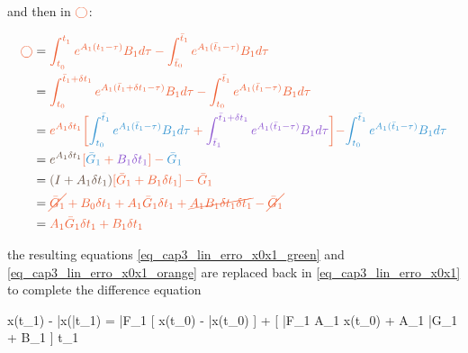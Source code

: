 \noindent
and then in $\orange{\bigcirc}$:

\noindent
\begin{align}
	\label{eq_cap3_lin_erro_x0x1_orange}
	\orange{\bigcirc} 	&= \orange{ \intlinAA{0}{1}{}{} - \intlinAbtt{0}{1} } \nonumber \\ 
				   	&= \orange{ \intlinCb{t_0}{\bar{t}_1+\delta t_1}{0}{1} - \intlinAbft{0}{1} } \nonumber \\
				   	&= \orange{ e^{A_1 \delta t_1} \bigg[ \blue{\intlinAbft{0}{1}} + \purple{\intlinB{\bar{t}_1}{\bar{t}_1 + \delta t_1}{0}{1}} \bigg] }
				   	   \orange{ -\blue{\intlinAbft{0}{1}} } \nonumber \\
				   	&= \orange{ \pink{e^{A_1 \delta t_1}} [ \blue{\bar{G}_1} + \purple{B_1 \delta t_1} ] - \blue{\bar{G}_1} } \nonumber \\
				   	&= \orange{ \pink{(I + A_1 \delta t_1)}[ \bar{G}_1 + B_1 \delta t_1 ] - \bar{G}_1 } \nonumber \\
				   	&= \orange{ \cancel{\bar{G}_1} + B_0 \delta t_1 + A_1 \bar{G}_1 \delta t_1 + \cancel{A_1 B_1 \delta t_1 \delta t_1} - \cancel{\bar{G}_1} } \nonumber \\
				   	&= \orange{ A_1 \bar{G}_1 \delta t_1 + B_1 \delta t_1 }
\end{align}

\noindent
the resulting equations \eqref{eq_cap3_lin_erro_x0x1_green} and \eqref{eq_cap3_lin_erro_x0x1_orange} are replaced back in \eqref{eq_cap3_lin_erro_x0x1} to complete the difference equation

\noindent
{}
{
	x(t_1) - \bar{x}(\bar{t}_1) = \bar{F}_1 [ x(t_0) - \bar{x}(t_0) ] + [ \bar{F}_1 A_1 x(t_0) + A_1 \bar{G}_1 + B_1 ] \delta t_1
}
